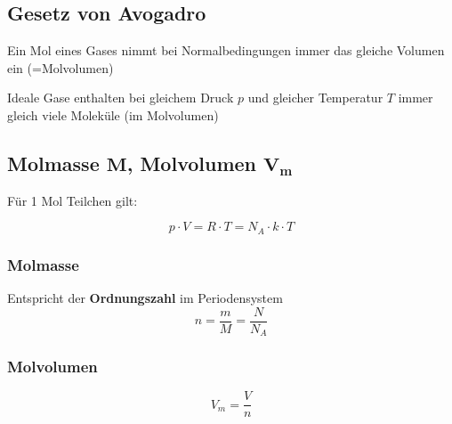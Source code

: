 \subsection{Gesetz von Avogadro}

Ein Mol eines Gases nimmt bei Normalbedingungen immer das gleiche Volumen ein (=Molvolumen) 

\medskip

Ideale Gase enthalten bei gleichem Druck $p$ und gleicher Temperatur $T$ immer gleich viele Moleküle (im Molvolumen)



\subsection[Molmasse / Molvolumen]{Molmasse $\bm{M}$, Molvolumen $\bm{V_m}$}

Für 1 Mol Teilchen gilt: 

$$ \boxed{ p \cdot V = R \cdot T = N_A \cdot k \cdot T } $$

\medskip

\begin{minipage}[t]{0.58\columnwidth}
	\subsubsection{Molmasse}

	Entspricht der \textbf{Ordnungszahl} im Periodensystem
	$$  \boxed{ n = \frac{m}{M} = \frac{N}{N_A} } $$
\end{minipage}
\hfill
\begin{minipage}[t]{0.38\columnwidth}
	\subsubsection{Molvolumen}
	
	\phantom{eifach öppis}
	$$ \boxed{ V_m = \frac{V}{n} }$$
\end{minipage}


